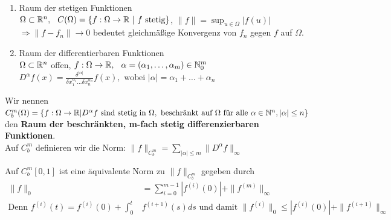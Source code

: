 \begin{beispiel}
	\begin{enumerate}[label=\alph*\upshape)]
		\item Raum der stetigen Funktionen  \\
		$\Omega \subset \mathbb{R}^{n}, \hspace{0.25cm} C(\Omega) = \{ f: \Omega \rightarrow \mathbb{R} \text{ | } f \text{ stetig} \}$, \hspace{0.25cm} $\| f \| = \sup_{u \in \Omega} |f(u)|$\\
		$\Rightarrow \| f - f_{n} \| \rightarrow 0$ bedeutet gleichmä{\ss}ige Konvergenz von $f_{n}$ gegen $f$ auf $\Omega$.
		\item Raum der differentierbaren Funktionen  \\
		$\Omega \subset \mathbb{R}^{n}$ offen, $f: \Omega \rightarrow \mathbb{R}, \hspace{0.25cm} \alpha = (\alpha_{1}, \dotsc, \alpha_{m}) \in \mathbb{N}_{0}^{m}$ \\
		$D^{\alpha}f(x) = \frac{ \delta^{ | \alpha | } }{ \delta x_{1}^{ \alpha_{1} } \dotsc \delta x_{n}^{ \alpha_{n} } } f(x), \text{ wobei } | \alpha | = \alpha_{1} + \dotsc + \alpha_{n} $ \\ 
	\end{enumerate}
\end{beispiel}

\begin{definition} 
Wir nennen $C_{b}^{m}(\Omega) = \{ f: \Omega \rightarrow \mathbb{R} | D^{\alpha}f \text{ sind stetig in } \Omega, \text{ beschränkt auf } \Omega \text{ für alle } \alpha \in \mathbb{N}^{n}, |\alpha| \leq n \}$ den \textbf{Raum der beschränkten, m-fach stetig differenzierbaren Funktionen}.  \\
Auf $C_{b}^{m}$ definieren wir die Norm: $\| f \|_{C_{b}^{m}} = \sum_{|\alpha| \leq m} \| D^{\alpha}f \|_{\infty}$
\end{definition}

\begin{bemerkung}
Auf $C_{b}^{m} [0, 1]$ ist eine äquivalente Norm zu  $\| f \|_{C_{b}^{m}}$ gegeben durch
\begin{align*}
	\| f \|_{0} & = \sum_{i = 0}^{m - 1} |f^{(i)}(0)| + \| f^{(m)} \|_{\infty} \\
	\text{Denn } f^{(i)}(t) = f^{(i)}(0) + \int_{0}^{t} & f^{(i + 1)}(s) ds \text{ und damit } \| f^{(i)}\|_{0} \leq | f^{(i)}(0) | + \| f^{(i + 1)}\|_{\infty}	
\end{align*}
\end{bemerkung}

